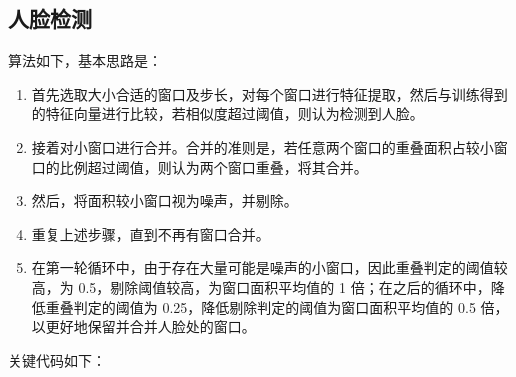 \documentclass[a4paper]{article}  %
\begin{document}
\subsection{人脸检测}

算法如下，基本思路是：

\begin{enumerate}
    \item 首先选取大小合适的窗口及步长，对每个窗口进行特征提取，然后与训练得到的特征向量进行比较，若相似度超过阈值，则认为检测到人脸。
    \item 接着对小窗口进行合并。合并的准则是，若任意两个窗口的重叠面积占较小窗口的比例超过阈值，则认为两个窗口重叠，将其合并。
    \item 然后，将面积较小窗口视为噪声，并剔除。
    \item 重复上述步骤，直到不再有窗口合并。
    \item 在第一轮循环中，由于存在大量可能是噪声的小窗口，因此重叠判定的阈值较高，为 0.5，剔除阈值较高，为窗口面积平均值的 1 倍；在之后的循环中，降低重叠判定的阈值为 0.25，降低剔除判定的阈值为窗口面积平均值的 0.5 倍，以更好地保留并合并人脸处的窗口。
\end{enumerate}

关键代码如下：
\end{document}
